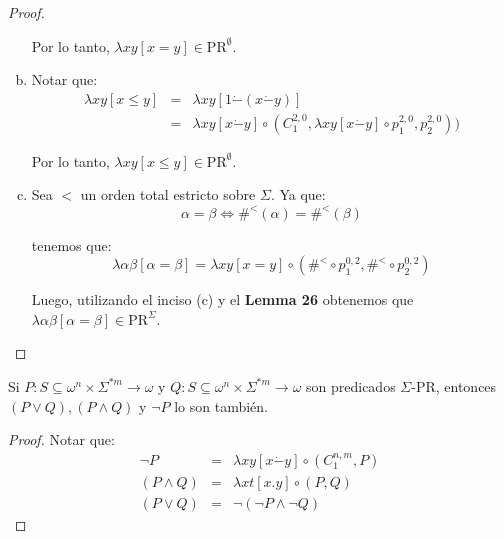 \begin{proof}
\begin{enumerate}[a)]
        \PN Por lo tanto, $\lambda xy \left[x=y\right] \in \mathrm{PR}^{\emptyset}$.

      \item Notar que:
        \begin{eqnarray*}
          \lambda xy \left[x \leq y\right] &=& \lambda xy\left[1 \dot{-}(x \dot{-}y)\right] \\
          &=& \lambda xy \left[x \dot{-}y\right] \circ (C_{1}^{2,0}, \lambda xy \left[x \dot{-}y\right] \circ
            p_{1}^{2,0}, p_{2}^{2,0}))
        \end{eqnarray*}

        \PN Por lo tanto, $\lambda xy \left[x \leq y\right] \in \mathrm{PR}^{\emptyset}$.

      \item Sea $<$ un orden total estricto sobre $\Sigma$. Ya que:
        \[
          \alpha = \beta \Leftrightarrow \#^{<}(\alpha) = \#^{<}(\beta)
        \]

        \PN tenemos que:
        \[
          \lambda \alpha\beta \left[\alpha=\beta\right] = \lambda xy \left[x=y\right] \circ (\#^{<} \circ p_{1}^{0,2},
          \#^{<} \circ p_{2}^{0,2})
        \]

        \PN Luego, utilizando el inciso (c) y el \textbf{Lemma 26} obtenemos que $\lambda \alpha\beta
        \left[\alpha=\beta\right] \in \mathrm{PR}^{\Sigma}$.
    \end{enumerate}
  \end{proof}

  \begin{lemma}
    \PN Si $P: S \subseteq \omega^{n} \times \Sigma^{\ast m} \rightarrow \omega$ y $Q: S \subseteq \omega^{n} \times
    \Sigma^{\ast m} \rightarrow \omega$ son predicados $\Sigma$-PR, entonces $(P \vee Q), (P \wedge Q)$ y $\neg P$ lo
    son también.
  \end{lemma}
  \begin{proof}
    \PN Notar que:
    \begin{eqnarray*}
      \neg P &=& \lambda xy \left[x \dot{-} y\right] \circ (C_{1}^{n, m}, P) \\
      (P \wedge Q) &=& \lambda xt \left[x.y\right] \circ (P, Q) \\
      (P \vee Q) &=& \neg (\neg P \wedge \neg Q)
    \end{eqnarray*}
  \end{proof}

